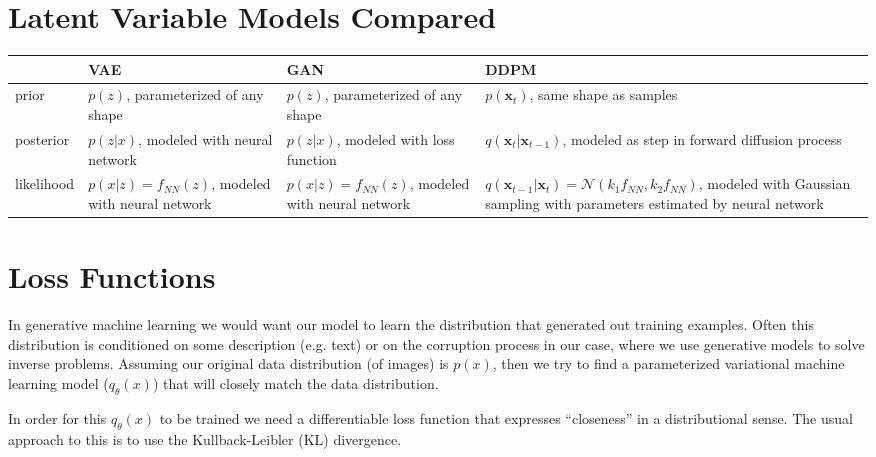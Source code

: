 \section{Latent Variable Models Compared}
\begin{table}[h]
    \centering
    \begin{tabular}{l | p{40mm} | p{40mm} | p{40mm}}
                   & VAE                                             & GAN                                             & DDPM                                                                                                                                           \\
        \hline\hline
        prior      & $p(z)$, parameterized of any shape              & $p(z)$, parameterized of any shape              & $p(\bm{x}_t)$, same shape as samples                                                                                                           \\
        posterior  & $p(z|x)$, modeled with neural network           & $p(z|x)$, modeled with loss function            & $q(\bm{x}_t|\bm{x}_{t-1})$, modeled as step in forward diffusion process                                                                       \\
        likelihood & $p(x|z)=f_{NN}(z)$, modeled with neural network & $p(x|z)=f_{NN}(z)$, modeled with neural network & $q(\bm{x}_{t-1}|\bm{x}_{t}) = \mathcal{N}(k_1 f_{NN}, k_2 f_{NN})$, modeled with Gaussian sampling with parameters estimated by neural network
    \end{tabular}
\end{table}

\section{Loss Functions}
In generative machine learning we would want our model to learn the distribution that generated
out training examples. Often this distribution is conditioned on some description (e.g. text) or
on the corruption process in our case, where we use generative models to solve inverse problems.
Assuming our original data distribution (of images) is $p(x)$, then we try to find a parameterized
variational machine learning model ($q_{\theta}(x)$) that will closely match the data distribution.

In order for this $q_{\theta}(x)$ to be trained we need a differentiable loss function that expresses
\enquote{closeness} in a distributional sense. The usual approach to this is to use the Kullback-Leibler (KL)
divergence.

